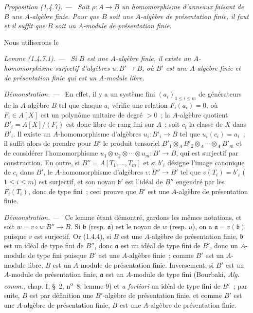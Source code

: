 \documentclass[10pt,oneside]{book}
\makeatletter
\newcommand{\setmanualcurrentlabel}[1]{\def\@currentlabel{#1}}
\newenvironment{proposition}[1][]{%
  \setmanualcurrentlabel{#1}\par\medskip\noindent\itshape Proposition (#1). ---\ }{\par}
\newenvironment{lemma}[1][]{%
  \setmanualcurrentlabel{#1}\par\medskip\noindent\itshape Lemme (#1). ---\ }{\par}
\newenvironment{proof}{%
  \par\medskip\noindent\textit{Démonstration. ---\ }}{\par}
\makeatother
\begin{document}
\begin{proposition}[1.4.7]
\label{IV.1.4.7-fr}
Soit $\rho:A\to B$ un homomorphisme d'anneaux faisant de $B$ une $A$-algèbre
finie. Pour que $B$ soit une $A$-algèbre de présentation finie, il faut et il
suffit que $B$ soit un $A$-module de présentation finie.
\end{proposition}

Nous utiliserons le

\begin{lemma}[1.4.7.1]
\label{IV.1.4.7.1-fr}
Si $B$ est une $A$-algèbre finie, il existe un $A$-homomorphisme surjectif
d'algèbres $u:B'\to B$, où $B'$ est une $A$-algèbre finie et de présentation
finie qui est un $A$-module libre.
\end{lemma}

\begin{proof}
En effet, il y a un système fini $(a_i)_{1\leq i\leq m}$ de générateurs de la
$A$-algèbre $B$ tel que chaque $a_i$ vérifie une relation $F_i(a_i)=0$, où
$F_i\in A[X]$ est un polynôme unitaire de degré $>0$~; la $A$-algèbre quotient
$B'_i=A[X]/(F_i)$ est donc libre de rang fini sur $A$~; soit $c_i$ la classe de
$X$ dans $B'_i$. Il existe un $A$-homomorphisme d'algèbres $u_i:B'_i\to B$
tel que $u_i(c_i)=a_i$~; il suffit alors de prendre pour $B'$ le produit
tensoriel $B'_1\otimes_AB'_2\otimes_A\cdots\otimes_AB'_m$ et de considérer
l'homomorphisme $u_1\otimes u_2\otimes\cdots\otimes u_m:B'\to B$, qui est
surjectif par construction. En outre, si $B''=A[T_1,\ldots,T_m]$ et si $b'_i$
désigne l'image canonique de $c_i$ dans $B'$, le $A$-homomorphisme d'algèbres
$v:B''\to B'$ tel que $v(T_i)=b'_i$ ($1\leq i\leq m$) est surjectif, et son
noyau $\mathfrak b'$ est l'idéal de $B''$ engendré par les $F_i(T_i)$, donc de
type fini~; ceci prouve que $B'$ est une $A$-algèbre de présentation finie.
\end{proof}

\begin{proof}
Ce lemme étant démontré, gardons les mêmes notations, et soit
$w=v\circ u:B''\to B$. Si $\mathfrak b$ (resp. $\mathfrak a$) est le noyau de
$w$ (resp. $u$), on a $\mathfrak a=v(\mathfrak b)$ puisque $v$ est surjectif.
Or (1.4.4), si $B$ est une $A$-algèbre de présentation finie, $\mathfrak b$
est un idéal de type fini de $B''$, donc $\mathfrak a$ est un idéal de type
fini de $B'$, donc un $A$-module de type fini puisque $B'$ est une $A$-algèbre
finie~; comme $B'$ est un $A$-module libre, $B$ est un $A$-module de
présentation finie. Inversement, si $B'$ est un $A$-module de présentation
finie, $\mathfrak a$ est un $A$-module de type fini (Bourbaki,
\emph{Alg. comm.}, chap. I, \S~2, n\textsuperscript{o}~8, lemme 9) et
\emph{a fortiori} un idéal de type fini de $B'$~; par suite, $B$ est par
définition une $B'$-algèbre de présentation finie, et comme $B'$ est une
$A$-algèbre de présentation finie, $B$ est une $A$-algèbre de présentation
finie.
\end{proof}
\end{document}
